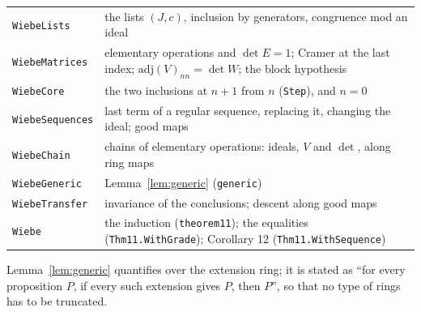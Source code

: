 \documentclass[11pt]{amsart}
\theoremstyle{remark}
\newcommand{\code}[1]{\texttt{#1}}
\newcommand{\adj}{\mathrm{adj}}
\begin{document}
\medskip
\begin{tabular}{p{}p{}}
\code{WiebeLists} & the lists $(J,c)$, inclusion by generators, congruence mod an ideal \\
\code{WiebeMatrices} & elementary operations and $\det E=1$; Cramer at the last index; $\adj(V)_{nn}=\det W$; the block hypothesis \\
\code{WiebeCore} & the two inclusions at $n+1$ from $n$ (\code{Step}), and $n=0$ \\
\code{WiebeSequences} & last term of a regular sequence, replacing it, changing the ideal; good maps \\
\code{WiebeChain} & chains of elementary operations: ideals, $V$ and $\det$, along ring maps \\
\code{WiebeGeneric} & Lemma~\ref{lem:generic} (\code{generic}) \\
\code{WiebeTransfer} & invariance of the conclusions; descent along good maps \\
\code{Wiebe} & the induction (\code{theorem11}); the equalities (\code{Thm11.WithGrade}); Corollary 12 (\code{Thm11.WithSequence})
\end{tabular}
\medskip

Lemma~\ref{lem:generic} quantifies over the extension ring; it is stated
as ``for every proposition $P$, if every such extension gives $P$, then
$P$'', so that no type of rings has to be truncated.
\end{document}

